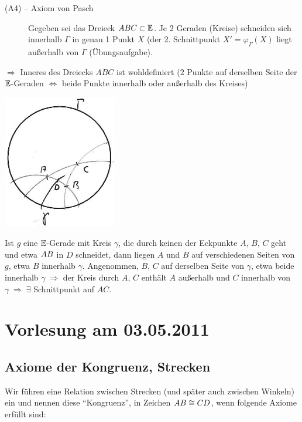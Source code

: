 \begin{description}
    \item[(A4) -- Axiom von Pasch] Gegeben sei das Dreieck $ABC\subset\mathbb E$. Je 2 Geraden (Kreise)
        schneiden sich innerhalb $\Gamma$ in genau 1 Punkt $X$ (der 2. Schnittpunkt $X' =
        \varphi_\Gamma(X)$ liegt außerhalb von $\Gamma$ (Übungsaufgabe).
\end{description}

$\Rightarrow$ Inneres des Dreiecks $ABC$ ist wohldefiniert (2 Punkte auf derselben Seite der
$\mathbb E$-Geraden $\Longleftrightarrow$ beide Punkte innerhalb oder außerhalb des Kreises)

\centerline{\includegraphics[width=5cm]{BILDER/4-2-08-Pasch.jpg}}

Ist $g$ eine $\mathbb E$-Gerade mit Kreis $\gamma$, die durch keinen der Eckpunkte $A,\, B,\, C$ geht und
etwa ${AB}$ in $D$ schneidet, dann liegen $A$ und $B$ auf verschiedenen Seiten von $g$, etwa $B$
innerhalb $\gamma$. Angenommen, $B,\, C$ auf derselben Seite von $\gamma$, etwa beide innerhalb
$\gamma\; \Rightarrow$ der Kreis durch $A,\, C$ enthält $A$ außerhalb und $C$ innerhalb von
$\gamma\; \Rightarrow\; \exists$ Schnittpunkt auf $AC$.

\section*{Vorlesung am 03.05.2011}

\subsection*{Axiome der Kongruenz, Strecken}

Wir führen eine Relation zwischen Strecken (und später auch zwischen Winkeln) ein und nennen diese
"`Kongruenz"', in Zeichen ${AB} \cong {CD}$, wenn folgende Axiome erfüllt sind: 

